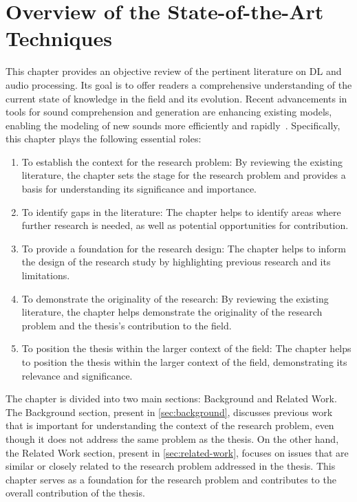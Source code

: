 \chapter{Overview of the State-of-the-Art Techniques} \label{chap:sota}

\minitoc

This chapter provides an objective review of the pertinent literature on \ac{DL} and audio processing. Its goal is to offer readers a comprehensive understanding of the current state of knowledge in the field and its evolution. Recent advancements in tools for sound comprehension and generation are enhancing existing models, enabling the modeling of new sounds more efficiently and rapidly~\cite{tahiroglu_-terity_2020}. Specifically, this chapter plays the following essential roles:

\begin{enumerate}
    \item To establish the context for the research problem: By reviewing the existing literature, the chapter sets the stage for the research problem and provides a basis for understanding its significance and importance.
    \item To identify gaps in the literature: The chapter helps to identify areas where further research is needed, as well as potential opportunities for contribution.
    \item To provide a foundation for the research design: The chapter helps to inform the design of the research study by highlighting previous research and its limitations.
    \item To demonstrate the originality of the research: By reviewing the existing literature, the chapter helps demonstrate the originality of the research problem and the thesis's contribution to the field.
    \item To position the thesis within the larger context of the field: The chapter helps to position the thesis within the larger context of the field, demonstrating its relevance and significance.
\end{enumerate}

The chapter is divided into two main sections: Background and Related Work. The Background section, present in \ref{sec:background}, discusses previous work that is important for understanding the context of the research problem, even though it does not address the same problem as the thesis. On the other hand, the Related Work section, present in \ref{sec:related-work}, focuses on issues that are similar or closely related to the research problem addressed in the thesis. This chapter serves as a foundation for the research problem and contributes to the overall contribution of the thesis.


